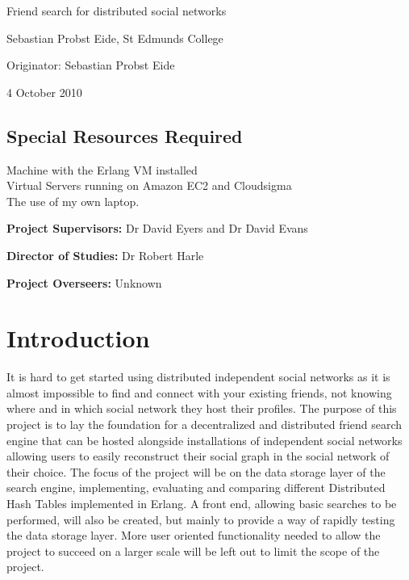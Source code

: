 

\vfil

\centerline{\Large Friend search for distributed social networks }
\vspace{0.4in}
\centerline{\large Sebastian Probst Eide, St Edmunds College }
\vspace{0.3in}
\centerline{\large Originator: Sebastian Probst Eide}
\vspace{0.3in}
\centerline{\large 4 October 2010}

\vfil

\subsection*{Special Resources Required}
Machine with the Erlang VM installed \\
Virtual Servers running on Amazon EC2 and Cloudsigma \\
The use of my own laptop.
\vspace{0.2in}

\noindent
{\bf Project Supervisors:} Dr David Eyers and Dr David Evans
\vspace{0.2in}

\noindent
{\bf Director of Studies:} Dr Robert Harle
\vspace{0.2in}
\noindent
 
\noindent
{\bf Project Overseers:} Unknown 

\vfil
\pagebreak


\section*{Introduction}

It is hard to get started using distributed independent social networks as it is almost impossible to find and connect with your existing friends, not knowing where and in which social network they host their profiles. The purpose of this project is to lay the foundation for a decentralized and distributed friend search engine that can be hosted alongside installations of independent social networks allowing users to easily reconstruct their social graph in the social network of their choice. The focus of the project will be on the data storage layer of the search engine, implementing, evaluating and comparing different Distributed Hash Tables implemented in Erlang. A front end, allowing basic searches to be performed, will also be created, but mainly to provide a way of rapidly testing the data storage layer. More user oriented functionality needed to allow the project to succeed on a larger scale will be left out to limit the scope of the project.

